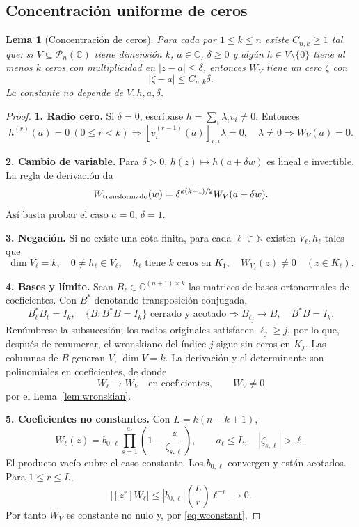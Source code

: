\documentclass[11pt,a4paper]{article}
\numberwithin{equation}{section}
\newtheorem{lemma}[theorem]{Lema}
\theoremstyle{definition}
\theoremstyle{remark}
\newcommand{\C}{\mathbb C}
\newcommand{\N}{\mathbb N}
\newcommand{\PP}{\mathcal P}
\newcommand{\paso}[1]{\par\smallskip\noindent\textbf{#1}\quad}
\begin{document}
\subsection{Concentración uniforme de ceros}
\begin{lemma}[Concentración de ceros]\label{lem:concentration}
Para cada par $1\le k\le n$ existe $C_{n,k}\ge1$ tal que: si $V\subseteq\PP_n(\C)$ tiene dimensión $k$, $a\in\C$, $\delta\ge0$ y algún $h\in V\setminus\{0\}$ tiene al menos $k$ ceros con multiplicidad en $|z-a|\le\delta$, entonces $W_V$ tiene un cero $\zeta$ con
\begin{equation}\label{eq:concentration}
|\zeta-a|\le C_{n,k}\delta.
\end{equation}
La constante no depende de $V,h,a,\delta$.
\end{lemma}
\begin{proof}
\paso{1. Radio cero.}
Si $\delta=0$, escríbase $h=\sum_i\lambda_iv_i\ne0$. Entonces
\[
h^{(r)}(a)=0\ (0\le r<k)
\Longrightarrow [v_i^{(r-1)}(a)]_{r,i}\lambda=0,\quad\lambda\ne0
\Longrightarrow W_V(a)=0.
\]
\paso{2. Cambio de variable.}
Para $\delta>0$, $h(z)\mapsto h(a+\delta w)$ es lineal e invertible. La regla de derivación da
\[
W_{\rm transformado}(w)=\delta^{k(k-1)/2}W_V(a+\delta w).
\]
Así basta probar el caso $a=0$, $\delta=1$.
\paso{3. Negación.}
Si no existe una cota finita, para cada $\ell\in\N$ existen $V_\ell,h_\ell$ tales que
\[
\dim V_\ell=k,\quad0\ne h_\ell\in V_\ell,\quad
h_\ell\text{ tiene }k\text{ ceros en }K_1,
\quad W_{V_\ell}(z)\ne0\quad(z\in K_\ell).
\]
\paso{4. Bases y límite.}
Sean $B_\ell\in\C^{(n+1)\times k}$ las matrices de bases ortonormales de coeficientes. Con $B^*$ denotando transposición conjugada,
\[
B_\ell^*B_\ell=I_k,\quad
\{B:B^*B=I_k\}\text{ cerrado y acotado}
\Longrightarrow B_{\ell_j}\to B,\quad B^*B=I_k.
\]
Renúmbrese la subsucesión; los radios originales satisfacen $\ell_j\ge j$, por lo que, después de renumerar, el wronskiano del índice $j$ sigue sin ceros en $K_j$. Las columnas de $B$ generan $V$, $\dim V=k$. La derivación y el determinante son polinomiales en coeficientes, de donde
\[
W_\ell\to W_V\quad\text{en coeficientes},\qquad W_V\ne0
\]
por el Lema~\ref{lem:wronskian}.
\paso{5. Coeficientes no constantes.}
Con $L=k(n-k+1)$,
\[
W_\ell(z)=b_{0,\ell}\prod_{s=1}^{a_\ell}\left(1-\frac z{\zeta_{s,\ell}}\right),
\qquad a_\ell\le L,\quad |\zeta_{s,\ell}|>\ell.
\]
El producto vacío cubre el caso constante. Los $b_{0,\ell}$ convergen y están acotados. Para $1\le r\le L$,
\[
|[z^r]W_\ell|\le |b_{0,\ell}|\binom Lr\ell^{-r}\longrightarrow0.
\]
Por tanto $W_V$ es constante no nulo y, por \eqref{eq:wconstant},

\end{proof}
\end{document}
